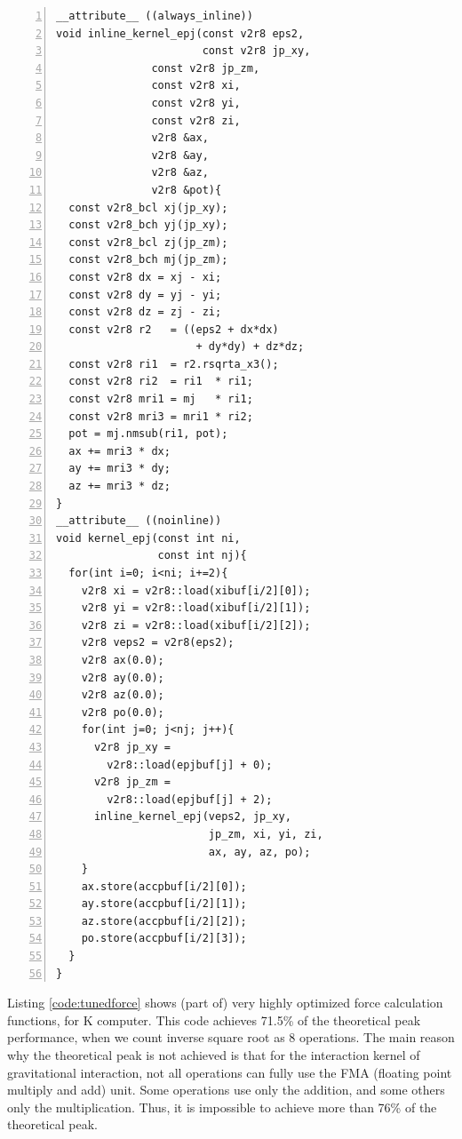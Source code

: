 \documentclass[dvipdfmx]{acm_proc_article-sp}
\begin{document}
\begin{lstlisting}[label=code:tunedforce,numbers=left,numbersep=5pt,frame=single,basicstyle=\ttfamily,caption=A highly optimized force function for $N$-body simulation]
__attribute__ ((always_inline))
void inline_kernel_epj(const v2r8 eps2,
                       const v2r8 jp_xy,
		       const v2r8 jp_zm,
		       const v2r8 xi,
		       const v2r8 yi,
		       const v2r8 zi,
		       v2r8 &ax,
		       v2r8 &ay,
		       v2r8 &az,
		       v2r8 &pot){
  const v2r8_bcl xj(jp_xy);
  const v2r8_bch yj(jp_xy);
  const v2r8_bcl zj(jp_zm);
  const v2r8_bch mj(jp_zm);
  const v2r8 dx = xj - xi;
  const v2r8 dy = yj - yi;
  const v2r8 dz = zj - zi;
  const v2r8 r2   = ((eps2 + dx*dx)
                      + dy*dy) + dz*dz;
  const v2r8 ri1  = r2.rsqrta_x3();
  const v2r8 ri2  = ri1  * ri1;
  const v2r8 mri1 = mj   * ri1;
  const v2r8 mri3 = mri1 * ri2;
  pot = mj.nmsub(ri1, pot);
  ax += mri3 * dx;
  ay += mri3 * dy;
  az += mri3 * dz;
}
__attribute__ ((noinline))
void kernel_epj(const int ni,
                const int nj){
  for(int i=0; i<ni; i+=2){
    v2r8 xi = v2r8::load(xibuf[i/2][0]);
    v2r8 yi = v2r8::load(xibuf[i/2][1]);
    v2r8 zi = v2r8::load(xibuf[i/2][2]);
    v2r8 veps2 = v2r8(eps2);
    v2r8 ax(0.0);
    v2r8 ay(0.0);
    v2r8 az(0.0);
    v2r8 po(0.0);
    for(int j=0; j<nj; j++){
      v2r8 jp_xy =
        v2r8::load(epjbuf[j] + 0);
      v2r8 jp_zm =
        v2r8::load(epjbuf[j] + 2);
      inline_kernel_epj(veps2, jp_xy,
                        jp_zm, xi, yi, zi,
                        ax, ay, az, po);
    }
    ax.store(accpbuf[i/2][0]);
    ay.store(accpbuf[i/2][1]);
    az.store(accpbuf[i/2][2]);
    po.store(accpbuf[i/2][3]);
  }
}                       
\end{lstlisting}



Listing \ref{code:tunedforce} shows (part of) very highly optimized
force calculation functions, for K computer. This code achieves 71.5\%
of the theoretical peak performance, when we count inverse square root
as 8 operations. The main reason why the theoretical peak is not
achieved is that for the interaction kernel of gravitational
interaction, not all operations can fully use the FMA (floating point
multiply and add) unit. Some operations use only the addition, and some
others only the multiplication. Thus, it is impossible to achieve more
than 76\% of the theoretical peak.
\end{document}
